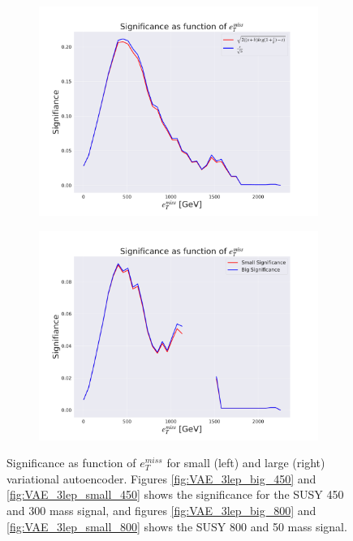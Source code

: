 \begin{figure}[H]
\begin{subfigure}{.45\textwidth}
        \includegraphics[width=\textwidth]{Figures/VAE_testing/big/3lep/significance_etmiss_800p0p050p.pdf}
        \caption{}
        \label{fig:VAE_3lep_big_800_signi}
    \end{subfigure}
    \hfill   
    \begin{subfigure}{.45\textwidth}
        \includegraphics[width=\textwidth]{Figures/VAE_testing/small/3lep/significance_etmiss_800p0p050p.pdf}
        \caption{}
        \label{fig:VAE_3lep_small_800_signi}
    \end{subfigure}
    \hfill      
    \caption[VAE | Significance as function of $e_T^{miss}$]{Significance as function of $e_T^{miss}$ for small (left) and large (right) 
    variational autoencoder. Figures \ref{fig:VAE_3lep_big_450} and \ref{fig:VAE_3lep_small_450} shows the significance for the SUSY 450 
    and 300 mass signal, and figures \ref{fig:VAE_3lep_big_800} and \ref{fig:VAE_3lep_small_800} shows the SUSY 800 and 50 mass signal.}
    \label{fig:VAE_3lep_recon_err_both_sig_signi}
\end{figure}
